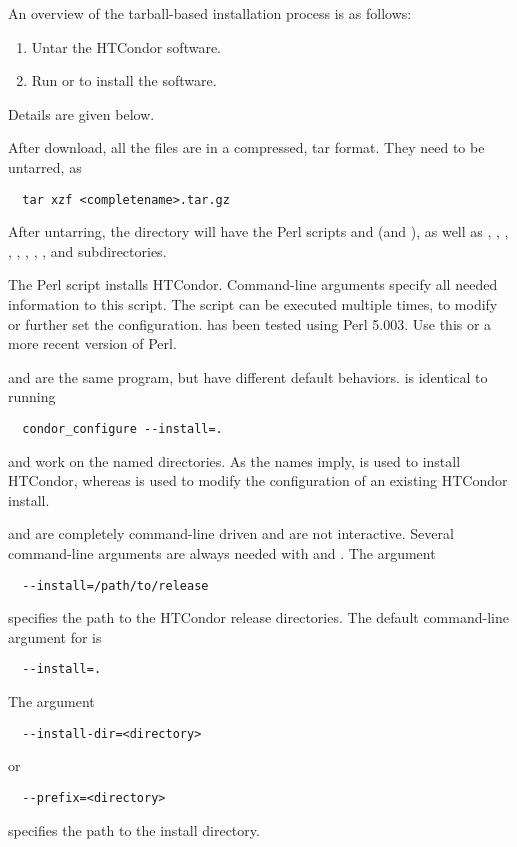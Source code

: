 
An overview of the tarball-based installation process is as follows:
\begin{enumerate}
\item Untar the HTCondor software.
\item Run  or  to install the software.
\end{enumerate}
Details are given below.

\medskip

After download, all the files are in a compressed, tar format.
They need to be untarred, as
\begin{verbatim}
  tar xzf <completename>.tar.gz
\end{verbatim}
After untarring, the directory will have the Perl scripts
 and  (and ), as well as 
, , , ,
, , , ,
 and  subdirectories.

The Perl script  installs HTCondor.
Command-line arguments specify all needed information to this
script.  The script can be executed multiple times, to modify or further
set the configuration.   has been tested using Perl 5.003.
Use this or a more recent version of Perl.

 and  are the same program, but have
different default behaviors.   is identical to
running 
\begin{verbatim}
  condor_configure --install=.
\end{verbatim}
 and  work on the named directories.
As the names imply,  is used to
install HTCondor, whereas  is used to modify the
configuration of an existing HTCondor install.

 and  are completely command-line
driven and are not interactive.  Several command-line arguments are
always needed with  and .
The argument
\begin{verbatim}
  --install=/path/to/release
\end{verbatim}
specifies the path to the HTCondor release directories.
The default command-line argument for  is 
\begin{verbatim}
  --install=.
\end{verbatim}
The argument
\begin{verbatim}
  --install-dir=<directory>
\end{verbatim}
or
\begin{verbatim}
  --prefix=<directory>
\end{verbatim}
specifies the path to the install directory.

